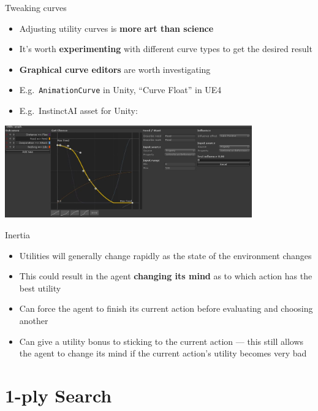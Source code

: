 \begin{frame}{Tweaking curves}
    \begin{itemize}
        \pause\item Adjusting utility curves is \textbf{more art than science}
        \pause\item It's worth \textbf{experimenting} with different curve types to get the desired result
        \pause\item \textbf{Graphical curve editors} are worth investigating
        \pause\item E.g.\ \lstinline{AnimationCurve} in Unity, ``Curve Float'' in UE4
        \pause\item E.g.\ InstinctAI asset for Unity:
    \end{itemize}
    \begin{center}
        \includegraphics[width=0.8\textwidth]{instinctai}
    \end{center}
\end{frame}

\begin{frame}{Inertia}
    \begin{itemize}
        \pause\item Utilities will generally change rapidly as the state of the environment changes
        \pause\item This could result in the agent \textbf{changing its mind} as to which action has the best utility
        \pause\item Can force the agent to finish its current action before evaluating and choosing another
        \pause\item Can give a utility bonus to sticking to the current action ---
            this still allows the agent to change its mind if the current action's utility becomes very bad
	\end{itemize}
\end{frame}

\part{1-ply Search}
\frame{\partpage}

